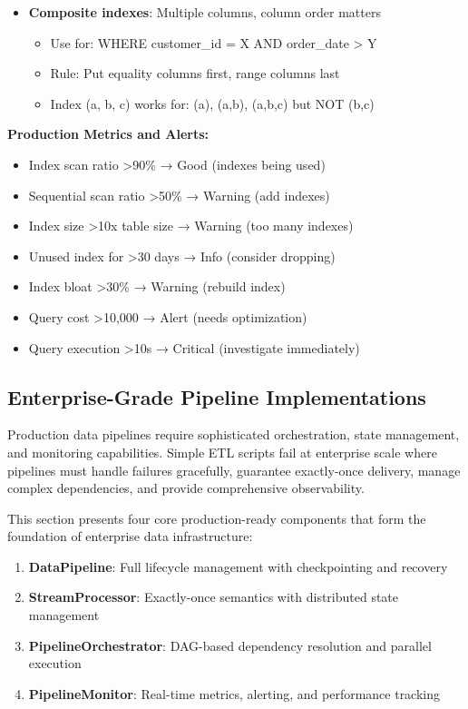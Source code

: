 \begin{itemize}
    \item \textbf{Composite indexes}: Multiple columns, column order matters
    \begin{itemize}
        \item Use for: WHERE customer\_id = X AND order\_date > Y
        \item Rule: Put equality columns first, range columns last
        \item Index (a, b, c) works for: (a), (a,b), (a,b,c) but NOT (b,c)
    \end{itemize}
\end{itemize}

\textbf{Production Metrics and Alerts:}

\begin{itemize}
    \item Index scan ratio >90\% → Good (indexes being used)
    \item Sequential scan ratio >50\% → Warning (add indexes)
    \item Index size >10x table size → Warning (too many indexes)
    \item Unused index for >30 days → Info (consider dropping)
    \item Index bloat >30\% → Warning (rebuild index)
    \item Query cost >10,000 → Alert (needs optimization)
    \item Query execution >10s → Critical (investigate immediately)
\end{itemize}

\subsection{Enterprise-Grade Pipeline Implementations}

Production data pipelines require sophisticated orchestration, state management, and monitoring capabilities. Simple ETL scripts fail at enterprise scale where pipelines must handle failures gracefully, guarantee exactly-once delivery, manage complex dependencies, and provide comprehensive observability.

This section presents four core production-ready components that form the foundation of enterprise data infrastructure:

\begin{enumerate}
    \item \textbf{DataPipeline}: Full lifecycle management with checkpointing and recovery
    \item \textbf{StreamProcessor}: Exactly-once semantics with distributed state management
    \item \textbf{PipelineOrchestrator}: DAG-based dependency resolution and parallel execution
    \item \textbf{PipelineMonitor}: Real-time metrics, alerting, and performance tracking
\end{enumerate}

